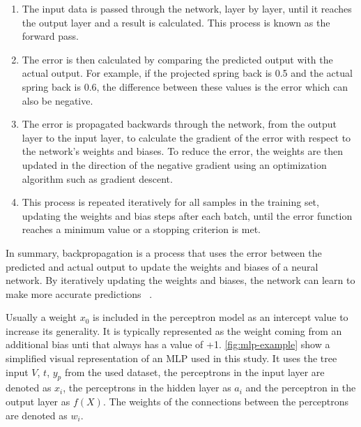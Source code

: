 \begin{enumerate}
    \item The input data is passed through the network, layer by layer, until it reaches the output layer and a
    result is calculated.
    This process is known as the forward pass.
    \item The error is then calculated by comparing the predicted output with the actual output.
    For example, if the projected spring back is 0.5 and the actual spring back is 0.6, the difference between these
    values is the error which can also be negative.
    \item The error is propagated backwards through the network, from the output layer to the input layer, to
    calculate the gradient of the error with respect to the network's weights and biases. To reduce the error,
    the weights are then updated in the direction of the negative gradient using an optimization algorithm such
    as gradient descent.
    \item This process is repeated iteratively for all
    samples in the training set, updating the weights and bias steps after each batch, until the error function
    reaches a minimum value or a stopping criterion is met.
\end{enumerate}

In summary, backpropagation is a process that uses the error between the predicted and actual output to update the
weights and biases of a neural network.
By iteratively updating the weights and biases, the network can learn to make more accurate predictions
~\cite[p. 53--57]{nielsen2015neural}.

Usually a weight $x_0$ is included in the perceptron model as an intercept value to increase its generality.
It is typically represented as the weight coming from an additional bias unti that always has a value of +1.
\cref{fig:mlp-example} show a simplified visual representation of an MLP used in this study.
It uses the tree input $V$, $t$, $y_p$ from the used dataset, the perceptrons in the input layer are denoted as $x_i$,
the perceptrons in the hidden layer as $a_i$ and the perceptron in the output layer as $f(X)$.
The weights of the connections between the perceptrons are denoted as $w_i$.

